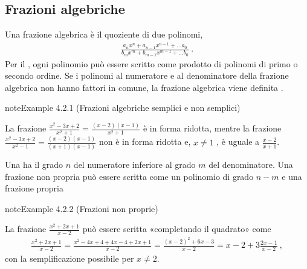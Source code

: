\documentclass[letterpaper,10pt,italian]{jupyterBook}
\begin{document}
\subsection{Frazioni algebriche}
\label{\detokenize{ch/algebra/real-algebra:frazioni-algebriche}}
\sphinxAtStartPar
Una frazione algebrica è il quoziente di due polinomi,
\begin{equation*}
\begin{split}\frac{a_n x^n + a_{n-1} x^{n-1} + \dots a_0}{b_m x^m + b_{m-1} x^{m-1} + \dots b_0} \ .\end{split}
\end{equation*}
\sphinxAtStartPar
Per il {\hyperref[\detokenize{ch/precalculus/polynomials:math-hs-precalculus-polynomials-alg-fund-thm}]{}}, ogni polinomio può essere scritto come prodotto di polinomi di primo o secondo ordine. Se i polinomi al numeratore e al denominatore della frazione algebrica non hanno fattori in comune, la frazione algebrica viene definita .
\label{ch/algebra/real-algebra:real-algebra-fraction-simple}
\begin{sphinxadmonition}{note}{Example 4.2.1 (Frazioni algebriche semplici e non semplici)}



\sphinxAtStartPar
La frazione \(\frac{x^2-3x+2}{x^2+1} = \frac{(x-2)(x-1)}{x^2+1}\) è in forma ridotta, mentre la frazione \(\frac{x^2-3x+2}{x^2-1} = \frac{(x-2)(x-1)}{(x+1)(x-1)}\) non è in forma ridotta e,  \(x \ne 1\) \sphinxstylestrong{(!)}, è uguale a \(\frac{x-2}{x+1}\).
\end{sphinxadmonition}

\sphinxAtStartPar
Una  ha il grado \(n\) del numeratore inferiore al grado \(m\) del denominatore. Una frazione non propria può essere scritta come un polinomio di grado \(n-m\) e una frazione propria
\label{ch/algebra/real-algebra:real-algebra-fraction-improper}
\begin{sphinxadmonition}{note}{Example 4.2.2 (Frazioni non proprie)}



\sphinxAtStartPar
La frazione \(\frac{x^2 + 2x + 1}{x - 2}\) può essere scritta «completando il quadrato» come
\begin{equation*}
\begin{split}\frac{x^2+2x+1}{x-2} = \frac{x^2-4x+4+4x-4+2x+1}{x-2} = \frac{(x-2)^2+6x-3}{x-2} = x-2 + 3\frac{2x-1}{x-2} \ ,\end{split}
\end{equation*}
\sphinxAtStartPar
con la semplificazione possibile per \(x \ne 2\).
\end{sphinxadmonition}
\end{document}

